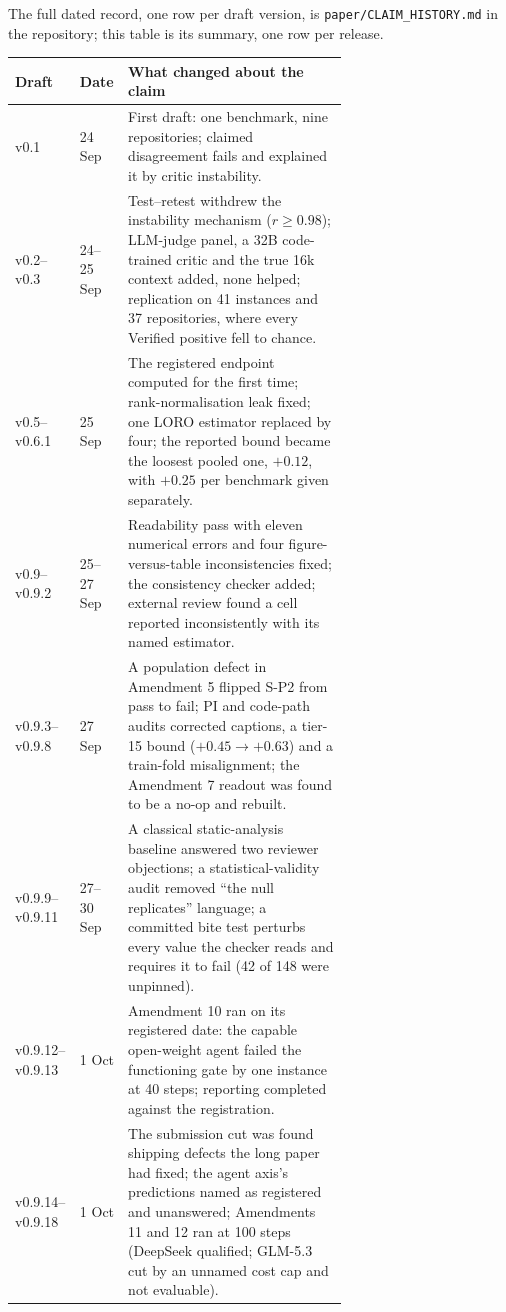 \documentclass[11pt]{article}
\begin{document}
\medskip
The full dated record, one row per draft version, is \texttt{paper/CLAIM\_HISTORY.md} in the repository; this table is its summary, one row per release.
\begin{longtable}{@{}llp{0.66\linewidth}@{}}\toprule
Draft & Date & What changed about the claim \\\midrule
v0.1 & 24 Sep & First draft: one benchmark, nine repositories; claimed disagreement fails and explained it by critic instability. \\
v0.2--v0.3 & 24--25 Sep & Test--retest withdrew the instability mechanism ($r\geq0.98$); LLM-judge panel, a 32B code-trained critic and the true 16k context added, none helped; replication on 41 instances and 37 repositories, where every Verified positive fell to chance. \\
v0.5--v0.6.1 & 25 Sep & The registered endpoint computed for the first time; rank-normalisation leak fixed; one LORO estimator replaced by four; the reported bound became the loosest pooled one, $+0.12$, with $+0.25$ per benchmark given separately. \\
v0.9--v0.9.2 & 25--27 Sep & Readability pass with eleven numerical errors and four figure-versus-table inconsistencies fixed; the consistency checker added; external review found a cell reported inconsistently with its named estimator. \\
v0.9.3--v0.9.8 & 27 Sep & A population defect in Amendment 5 flipped S-P2 from pass to fail; PI and code-path audits corrected captions, a tier-15 bound ($+0.45\to+0.63$) and a train-fold misalignment; the Amendment 7 readout was found to be a no-op and rebuilt. \\
v0.9.9--v0.9.11 & 27--30 Sep & A classical static-analysis baseline answered two reviewer objections; a statistical-validity audit removed ``the null replicates'' language; a committed bite test perturbs every value the checker reads and requires it to fail (42 of 148 were unpinned). \\
v0.9.12--v0.9.13 & 1 Oct & Amendment 10 ran on its registered date: the capable open-weight agent failed the functioning gate by one instance at 40 steps; reporting completed against the registration. \\
v0.9.14--v0.9.18 & 1 Oct & The submission cut was found shipping defects the long paper had fixed; the agent axis's predictions named as registered and unanswered; Amendments 11 and 12 ran at 100 steps (DeepSeek qualified; GLM-5.3 cut by an unnamed cost cap and not evaluable). \\

\end{longtable}
\end{document}
